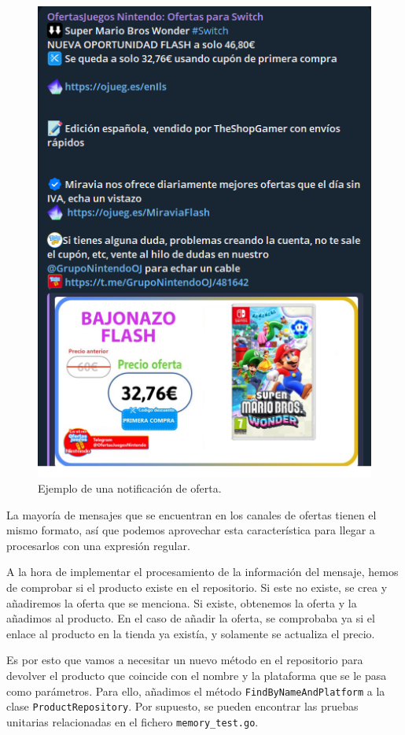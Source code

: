 \begin{figure}[h]
    \centering
    \includegraphics[scale=0.3]{figuras/ejemplo-ofertasjuegos.png}
    \caption{Ejemplo de una notificación de oferta.}
    \label{fig:ejemplo de oferta}
\end{figure}

La mayoría de mensajes que se encuentran en los canales de ofertas tienen el mismo 
formato, así que podemos aprovechar esta característica para llegar a procesarlos 
con una expresión regular.

A la hora de implementar el procesamiento de la información del mensaje, hemos de 
comprobar si el producto existe en el repositorio. Si este no existe, se crea y 
añadiremos la oferta que se menciona. Si existe, obtenemos la oferta y la añadimos 
al producto. En el caso de añadir la oferta, se comprobaba ya si el enlace al 
producto en la tienda ya existía, y solamente se actualiza el precio.

Es por esto que vamos a necesitar un nuevo método en el repositorio para devolver 
el producto que coincide con el nombre y la plataforma que se le pasa como 
parámetros. Para ello, añadimos el método \verb|FindByNameAndPlatform| a la clase 
\verb|ProductRepository|. Por supuesto, se pueden encontrar las pruebas unitarias 
relacionadas en el fichero \verb|memory_test.go|.

